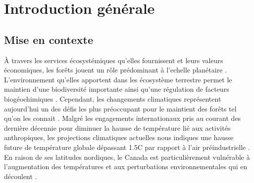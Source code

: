 \chapter*{Introduction générale}         %
\label{chap-introduction}       %

\section*{Mise en contexte}
\label{sec:contexte}
À travers les services écosystémiques qu'elles fournissent et leurs valeurs économiques, les forêts jouent un rôle prédominant à l'echelle planétaire \citep{Balvanera2006Quantifyingevidence}.
L'environnement qu'elles apportent dans les écosystème terrestre permet le maintien d’une biodiversité importante ainsi qu'une régulation de facteurs biogéochimiques \citep{Pawson2013Plantationforests}. 
Cependant, les changements climatiques représentent aujourd'hui un des défis les plus préoccupant pour le maintient des forêts tel qu'on les connait \citep{McKenney2009Climatechange,Messier2022Warningnatural,Seidl2017Forestdisturbances,Trumbore2015Foresthealth}.  
Malgré les engagements internationaux pris au courant des dernière décennie pour diminuer la hausse de température lié aux activités anthropiques, 
les projections climatiques actuelles nous indiques une hausse future de température globale dépassant 1.5C par rapport à l'air préindustrielle \citep{Matthews2022Currentglobal}.
En raison de ses latitudes nordiques, le Canada est particulièrement vulnérable à l'augmentation des températures et aux perturbations environnementales qui en découlent \citep{Alo2008Potentialfuture,Bush2019Canadachanging}. 

